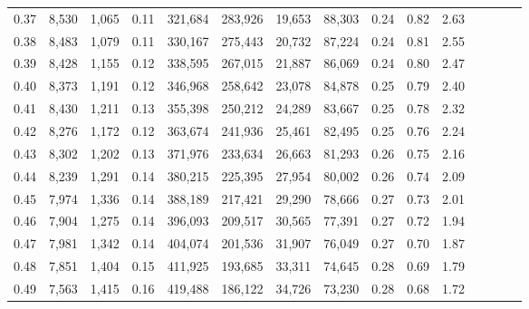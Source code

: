 \begin{tabular}{rrrcrrrrrrrrrrr}
0.37 &   8,530 &   1,065 &                                       0.11 &  321,684 &  283,926 &   19,653 &   88,303 &  0.24 &  0.82 &                         2.63 \\
0.38 &   8,483 &   1,079 &                                       0.11 &  330,167 &  275,443 &   20,732 &   87,224 &  0.24 &  0.81 &                         2.55 \\
0.39 &   8,428 &   1,155 &                                       0.12 &  338,595 &  267,015 &   21,887 &   86,069 &  0.24 &  0.80 &                         2.47 \\
0.40 &   8,373 &   1,191 &                                       0.12 &  346,968 &  258,642 &   23,078 &   84,878 &  0.25 &  0.79 &                         2.40 \\
0.41 &   8,430 &   1,211 &                                       0.13 &  355,398 &  250,212 &   24,289 &   83,667 &  0.25 &  0.78 &                         2.32 \\
0.42 &   8,276 &   1,172 &                                       0.12 &  363,674 &  241,936 &   25,461 &   82,495 &  0.25 &  0.76 &                         2.24 \\
0.43 &   8,302 &   1,202 &                                       0.13 &  371,976 &  233,634 &   26,663 &   81,293 &  0.26 &  0.75 &                         2.16 \\
0.44 &   8,239 &   1,291 &                                       0.14 &  380,215 &  225,395 &   27,954 &   80,002 &  0.26 &  0.74 &                         2.09 \\
0.45 &   7,974 &   1,336 &                                       0.14 &  388,189 &  217,421 &   29,290 &   78,666 &  0.27 &  0.73 &                         2.01 \\
0.46 &   7,904 &   1,275 &                                       0.14 &  396,093 &  209,517 &   30,565 &   77,391 &  0.27 &  0.72 &                         1.94 \\
0.47 &   7,981 &   1,342 &                                       0.14 &  404,074 &  201,536 &   31,907 &   76,049 &  0.27 &  0.70 &                         1.87 \\
0.48 &   7,851 &   1,404 &                                       0.15 &  411,925 &  193,685 &   33,311 &   74,645 &  0.28 &  0.69 &                         1.79 \\
0.49 &   7,563 &   1,415 &                                       0.16 &  419,488 &  186,122 &   34,726 &   73,230 &  0.28 &  0.68 &                         1.72 \\

\end{tabular}
